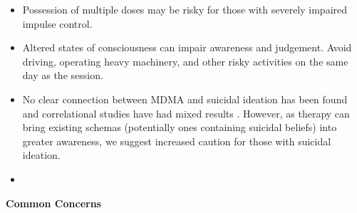 \documentclass[12pt,letterpaper]{article}
\begin{document}
\begin{itemize}
    \item Possession of multiple doses may be risky for those with severely impaired impulse control.
    \item Altered states of consciousness can impair awareness and judgement. Avoid driving, operating heavy machinery, and other risky activities on the same day as the session.
    \item No clear connection between MDMA and suicidal ideation has been found and correlational studies have had mixed results \cite{jonesSuicideAdults,jonesSuicideAdolescents,kimSuicide}. However, as therapy can bring existing schemas (potentially ones containing suicidal beliefs) into greater awareness, we suggest increased caution for those with suicidal ideation. 
    \item {}
\end{itemize}
\noindent \textbf{Common Concerns}
\end{document}
